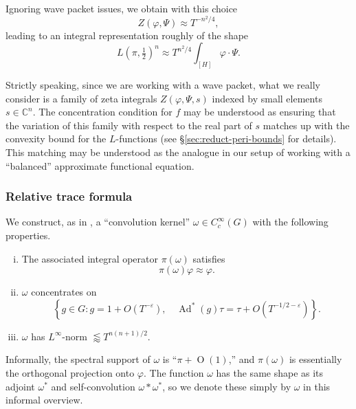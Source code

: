 \documentclass[reqno]{amsart}
\DeclareMathOperator{\Ad}{Ad}
\def\eps{\varepsilon}
\def\O{\operatorname{O}}
\theoremstyle{plain} \newtheorem{theorem} {Theorem}
\theoremstyle{definition} \newtheorem{definition} [theorem] {Definition}
\theoremstyle{itplain} %
\numberwithin{equation}{section}
\numberwithin{theorem}{section}
\begin{document}
Ignoring wave packet issues, we obtain with this choice
\begin{equation}\label{eq:zvarphi-psi-approx}
Z(\varphi, \Psi) \approx T^{-n^2/4},
\end{equation}
leading to an integral representation roughly of the shape
\begin{equation*}
  L(\pi,\tfrac{1}{2})^{n}  \approx T^{n^2/4} \int _{[H]} \varphi \cdot \Psi.
\end{equation*}
\begin{remark}
  Strictly speaking, since we are working with a wave packet, what we really consider is a family of zeta integrals $Z(\varphi, \Psi, s)$ indexed by small elements $s \in \mathbb{C}^n$.  The concentration condition for $f$ may be understood as ensuring that the variation of this family with respect to the real part of $s$ matches up with the convexity bound for the $L$-functions (see \S\ref{sec:reduct-peri-bounds} for details).  This matching may be understood as the analogue in our setup of working with a ``balanced'' approximate functional equation.
\end{remark}

\subsubsection{Relative trace formula}\label{sec:relat-trace-form}
We construct, as in \cite[\S1.5.2]{2020arXiv201202187N}, a ``convolution kernel'' $\omega \in C_c^\infty(G)$ with the following properties.
\begin{enumerate}[(i)]
\item The associated integral operator $\pi(\omega)$ satisfies
  \begin{equation}\label{eq:piom-varphi-appr}
    \pi(\omega) \varphi \approx \varphi.
  \end{equation}
\item $\omega$ concentrates on
  \begin{equation*}
    \left\{ g \in G : g = 1 + O(T^{-\eps}), \quad \Ad^*(g) \tau = \tau + O(T^{-1/2-\eps}) \right\}.
  \end{equation*}
\item $\omega$ has $L^\infty$-norm $\lessapprox T^{n(n+1)/2}$.
\end{enumerate}
Informally, the spectral support of $\omega$ is ``$\pi + \O(1)$,'' and $\pi(\omega)$ is essentially the orthogonal projection onto $\varphi$.  The function $\omega$ has the same shape as its adjoint $\omega^*$ and self-convolution $\omega \ast \omega^{\ast}$, so we denote these simply by $\omega$ in this informal overview.
\end{document}
